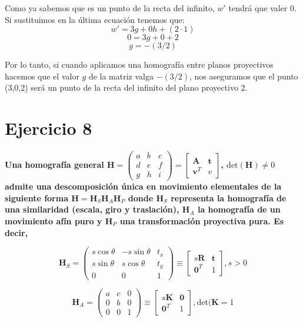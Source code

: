 \documentclass[11pt,a4paper]{article}
\begin{document}
Como ya sabemos que es un punto de la recta del infinito, $w'$ tendrá que valer 0. Si sustituimos en la última ecuación tenemos que:
$$w' = 3g+0h+(2\cdot1)$$
$$0  = 3g+0+2$$
$$g = -(3/2)$$

Por lo tanto, si cuando aplicamos una homografía entre planos proyectivos hacemos que el valor $g$ de la matriz valga $-(3/2)$, nos aseguramos que el
punto (3,0,2) será un punto de la recta del infinito del plano proyectivo 2.


\section*{Ejercicio 8}
\textbf{Una homografía general $\mathbf{H}=\begin{pmatrix}a & b & c \\ d & e & f \\
g & h & i \end{pmatrix} = \begin{bmatrix} \mathbf{A} & \mathbf{t} \\ \mathbf{v}^T & v
\end{bmatrix}$, $\text{det}(\mathbf{H}) \neq 0$ admite una
descomposición única en movimiento elementales de la siguiente
forma $\mathbf{H} = \mathbf{H}_S\mathbf{H}_A\mathbf{H}_P$ donde $\mathbf{H}_S$
representa la homografía de una similaridad
(escala, giro y traslación), $\mathbf{H}_A$ la homografía de un movimiento afín
puro y $\mathbf{H}_P$ una transformación proyectiva pura. Es decir,}

$$\mathbf{H}_S = \begin{pmatrix} s\cos\theta & -s\sin\theta & t_x \\ s\sin\theta & s\cos\theta & t_y \\
0 & 0 & 1 \end{pmatrix} \equiv \begin{bmatrix} s\mathbf{R} & \mathbf{t} \\ \mathbf{0}^T & 1 \end{bmatrix}, s>0$$

$$\mathbf{H}_A = \begin{pmatrix} a & c & 0 \\ 0 & b &0 \\ 0 & 0 & 1 \end{pmatrix} \equiv
\begin{bmatrix} s\mathbf{K} & \mathbf{0} \\ \mathbf{0}^T & 1 \end{bmatrix}, \text{det}(\mathbf{K}=1$$
\end{document}
